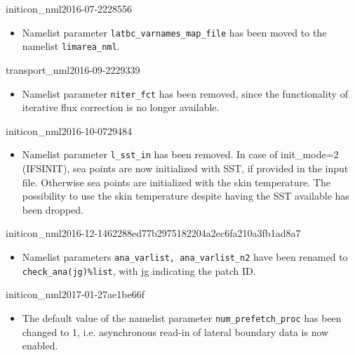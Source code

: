 \begin{changeitem}{initicon\_nml}{2016-07-22}{28556}
  \begin{itemize}
   \item Namelist parameter \texttt{latbc\_varnames\_map\_file} has
     been moved to the namelist \texttt{limarea\_nml}.
  \end{itemize}
\end{changeitem}

\begin{changeitem}{transport\_nml}{2016-09-22}{29339}
  \begin{itemize}
   \item Namelist parameter \texttt{niter\_fct} has been removed, since the functionality of 
   iterative flux correction is no longer available.
  \end{itemize}
\end{changeitem}

\begin{changeitem}{initicon\_nml}{2016-10-07}{29484}
  \begin{itemize}
   \item Namelist parameter \texttt{l\_sst\_in} has been removed. In case of init\_mode=2 (IFSINIT), 
   sea points are now initialized with SST, if provided in the input file. Otherwise sea points are initialized 
   with the skin temperature. The possibility to use the skin temperature despite having the SST available 
   has been dropped.
  \end{itemize}
\end{changeitem}

\begin{changeitem}{initicon\_nml}{2016-12-14}{62288ed77b2975182204a2ec6fa210a3fb1ad8a7}
  \begin{itemize}
   \item Namelist parameters \texttt{ana\_varlist, ana\_varlist\_n2} have been renamed to \texttt{check\_ana(jg)\%list}, 
   with jg indicating the patch ID.
  \end{itemize}
\end{changeitem}

\begin{changeitem}{initicon\_nml}{2017-01-27}{ae1be66f}
  \begin{itemize}
   \item The default value of the namelist parameter
     \texttt{num\_prefetch\_proc} has been changed to 1,
     i.e. asynchronous read-in of lateral boundary data is now
     enabled.
  \end{itemize}
\end{changeitem}

